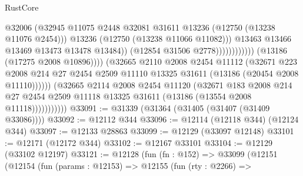 \begin{lexlean}{RustCore}
\begin{coremodule}
                                                      @32006
                                                      (@32945
                                                        @11075
                                                        @2448
                                                        @32081
                                                        @31611
                                                        @13236
                                                        (@12750 (@13238 @11076 @2454)))
                                                      @13236
                                                      (@12750 (@13238 @11066 @11082)))
                                                    @13463
                                                    @13466
                                                    @13469
                                                    @13473
                                                    @13478
                                                    @13484))
                                                (@12854 @31506 @2778))))))))))))
                          (@13186 (@17275 @2008 @10896))))
                      (@32665
                        @2110
                        @2008
                        @2454
                        @11112
                        (@32671
                          @223
                          @2008
                          @214
                          @27
                          @2454
                          @2509
                          @11110
                          @13325
                          @31611
                          (@13186 (@20454 @2008 @11110))))))
                  (@32665
                    @2114
                    @2008
                    @2454
                    @11120
                    (@32671
                      @183
                      @2008
                      @214
                      @27
                      @2454
                      @2509
                      @11118
                      @13325
                      @31611
                      (@13186 (@13554 @2008 @11118)))))))))))
@33091 := @31339 (@31364 (@31405 (@31407 (@31409 @33086))))
@33092 := @12112 @344
@33096 := @12114 (@12118 @344) (@12124 @344)
@33097 := @12133 @28863
@33099 := @12129 (@33097 @12148)
@33101 := @12171 (@12172 @344)
@33102 := @12167 @33101
@33104 := @12129 (@33102 @12197)
@33121 := @12128
    (fun (fn : @152) =>
    @33099
      (@12151
        (@12154
          (fun (params : @12153) =>
          @12155
            (fun (rty : @2266) =>

\end{coremodule}
\end{lexlean}
